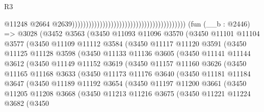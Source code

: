 \begin{lexlean}{R3}
\begin{coremodule}
                                                                                      @11248
                                                                                      @2664
                                                                                      @2639)))))))))))))))))))))))))))))))))))))))))
    (fun (__b : @2446) =>
    @3028
      (@3452
        @3563
        (@3450
          @11093
          @11096
          @3570
          (@3450
            @11101
            @11104
            @3577
            (@3450
              @11109
              @11112
              @3584
              (@3450
                @11117
                @11120
                @3591
                (@3450
                  @11125
                  @11128
                  @3598
                  (@3450
                    @11133
                    @11136
                    @3605
                    (@3450
                      @11141
                      @11144
                      @3612
                      (@3450
                        @11149
                        @11152
                        @3619
                        (@3450
                          @11157
                          @11160
                          @3626
                          (@3450
                            @11165
                            @11168
                            @3633
                            (@3450
                              @11173
                              @11176
                              @3640
                              (@3450
                                @11181
                                @11184
                                @3647
                                (@3450
                                  @11189
                                  @11192
                                  @3654
                                  (@3450
                                    @11197
                                    @11200
                                    @3661
                                    (@3450
                                      @11205
                                      @11208
                                      @3668
                                      (@3450
                                        @11213
                                        @11216
                                        @3675
                                        (@3450
                                          @11221
                                          @11224
                                          @3682
                                          (@3450

\end{coremodule}
\end{lexlean}
